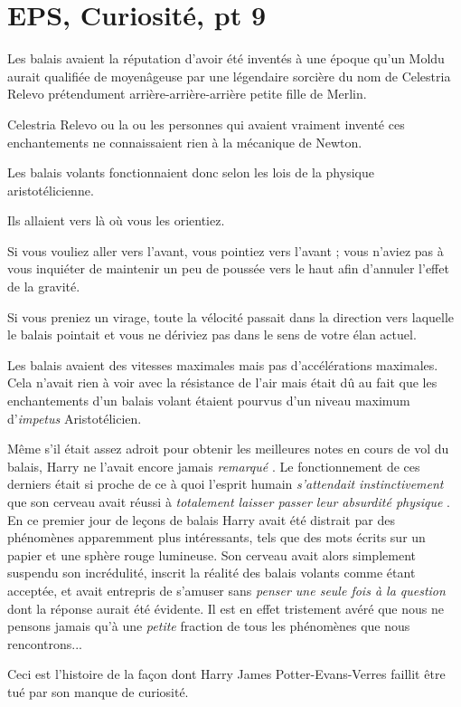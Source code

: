 
\chapter{EPS, Curiosité, pt 9}

Les balais avaient la réputation d'avoir été inventés à une époque qu'un Moldu aurait qualifiée de moyenâgeuse par une légendaire sorcière du nom de Celestria Relevo prétendument arrière-arrière-arrière petite fille de Merlin.

Celestria Relevo ou la ou les personnes qui avaient vraiment inventé ces enchantements ne connaissaient rien à la mécanique de Newton.

Les balais volants fonctionnaient donc selon les lois de la physique aristotélicienne.

Ils allaient vers là où vous les orientiez.

Si vous vouliez aller vers l'avant, vous pointiez vers l'avant ; vous n'aviez pas à vous inquiéter de maintenir un peu de poussée vers le haut afin d'annuler l'effet de la gravité.

Si vous preniez un virage, toute la vélocité passait dans la direction vers laquelle le balais pointait et vous ne dériviez pas dans le sens de votre élan actuel.

Les balais avaient des vitesses maximales mais pas d'accélérations maximales. Cela n'avait rien à voir avec la résistance de l'air mais était dû au fait que les enchantements d'un balais volant étaient pourvus d'un niveau maximum d'\emph{impetus}  Aristotélicien.

Même s'il était assez adroit pour obtenir les meilleures notes en cours de vol du balais, Harry ne l'avait encore jamais \emph{remarqué} . Le fonctionnement de ces derniers était si proche de ce à quoi l'esprit humain \emph{s'attendait instinctivement}  que son cerveau avait réussi à \emph{totalement laisser passer leur absurdité physique} . En ce premier jour de leçons de balais Harry avait été distrait par des phénomènes apparemment plus intéressants, tels que des mots écrits sur un papier et une sphère rouge lumineuse. Son cerveau avait alors simplement suspendu son incrédulité, inscrit la réalité des balais volants comme étant acceptée, et avait entrepris de s'amuser sans \emph{penser une seule fois à la question}  dont la réponse aurait été évidente. Il est en effet tristement avéré que nous ne pensons jamais qu'à une \emph{petite}  fraction de tous les phénomènes que nous rencontrons...

Ceci est l'histoire de la façon dont Harry James Potter-Evans-Verres faillit être tué par son manque de curiosité.

